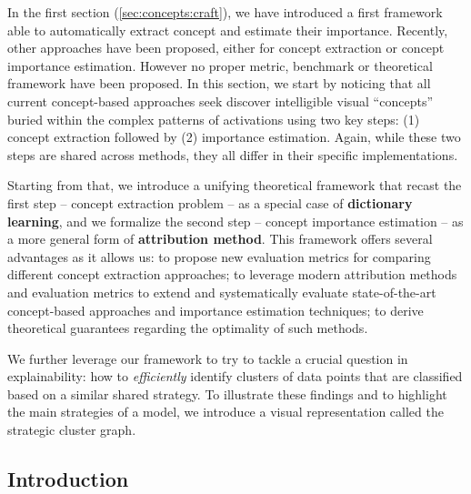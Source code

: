 
\newcommand{\ACE}{\textbf{\textcolor{color1}{ACE}}}
\newcommand{\ICE}{\textbf{\textcolor{color2}{ICE}}}

\newcommand{\fa}{\bm{g}}
\newcommand{\fb}{\bm{h}}

In the first section (\autoref{sec:concepts:craft}), we have introduced a first framework able to automatically extract concept and estimate their importance. Recently, other approaches have been proposed, either for concept extraction or concept importance estimation. However no proper metric, benchmark or theoretical framework have been proposed. In this section, we start by noticing that all current concept-based approaches seek discover intelligible visual ``concepts'' buried within the complex patterns of activations using two key steps: (1) concept extraction followed by (2) importance estimation. Again, while these two steps are shared across methods, they all differ in their specific implementations.

Starting from that, we introduce a unifying theoretical framework that recast the first step -- concept extraction problem -- as a special case of \textbf{dictionary learning}, and we formalize the second step -- concept importance estimation -- as a more general form of \textbf{attribution method}.
This framework offers several advantages as it allows us:  to propose new evaluation metrics for comparing different concept extraction approaches;  to leverage modern attribution methods and evaluation metrics to extend and systematically evaluate state-of-the-art concept-based approaches and importance estimation techniques;   to derive theoretical guarantees regarding the optimality of such methods.

We further leverage our framework to try to tackle a crucial question in explainability: how to \textit{efficiently} identify clusters of data points that are classified based on a similar shared strategy.
To illustrate these findings and to highlight the main strategies of a model, we introduce a visual representation called the strategic cluster graph.


\subsection{Introduction}

